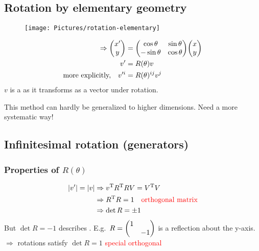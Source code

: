 \documentclass[11pt,fleqn]{book} %
\begin{document}
\subsection{Rotation by elementary geometry}
\begin{figure}[h]
\centering\texttt{[image: Pictures/rotation-elementary]}
\end{figure}
\begin{align*}
  \Rightarrow \mqty(x' \\ y) &= \mqty(\cos \theta & \sin \theta \\ -\sin \theta & \cos \theta\\) \mqty(x \\ y) \\
  v' &= R(\theta) v \\
  \text{more explicitly,\quad} v'^i &= R(\theta)^{ij} v^j
\end{align*}
\(v\) is a  as it transforms as a vector under rotation.
\begin{remark}
  This method can hardly be generalized to higher dimensions. Need a more
  systematic way!
\end{remark}

\subsection{Infinitesimal rotation (generators)}

\subsubsection{Properties of \(R(\theta)\)}
\begin{align*}
  \abs{v'} = \abs{v} &\Rightarrow v^{\mathrm{T}} R^{\mathrm{T}} R V = V^{\mathrm{T}} V \\
                     &\Rightarrow R^{\mathrm{T}} R = 1 \quad \text{\textcolor{red}{orthogonal matrix}}\\
                     &\Rightarrow \det R = \pm 1
\end{align*}
But \(\det R = -1\) describes . E.g.\ \(R=\mqty(\dmat{1, -1})\) is a reflection about the y-axis. \\
\(\Rightarrow\) rotations satisfy \(\det R = 1\) \quad \textcolor{red}{special orthogonal}
\end{document}
